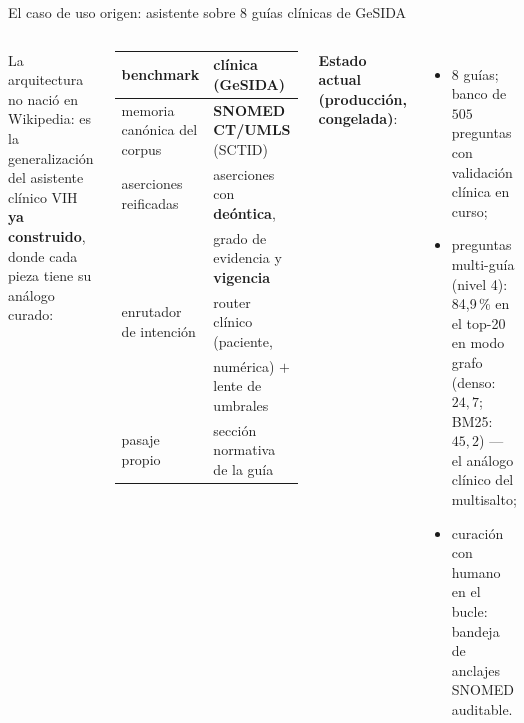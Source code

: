 \documentclass[aspectratio=169,10pt]{beamer}
\begin{document}
\begin{frame}{El caso de uso origen: asistente sobre 8 guías clínicas de GeSIDA}
\begin{columns}[T]
La arquitectura no nació en Wikipedia: es la generalización del asistente
clínico VIH \textbf{ya construido}, donde cada pieza tiene su análogo curado:
\begin{center}\footnotesize
\begin{tabular}{ll}
\toprule
benchmark & clínica (GeSIDA)\\
\midrule
memoria canónica del corpus & \textbf{SNOMED\,CT/UMLS} (SCTID)\\
aserciones reificadas & aserciones con \textbf{deóntica},\\
 & grado de evidencia y \textbf{vigencia}\\
enrutador de intención & router clínico (paciente,\\
 & numérica) $+$ lente de umbrales\\
pasaje propio & sección normativa de la guía\\
\bottomrule
\end{tabular}
\end{center}
\footnotesize
\textbf{Estado actual (producción, congelada)}:
\begin{itemize}\footnotesize
\item 8 guías; banco de $505$ preguntas con validación clínica en curso;
\item preguntas multi-guía (nivel 4): 84,9\,\% en el top-20 en modo grafo
  (denso: $24{,}7$; BM25: $45{,}2$) --- el análogo clínico del multisalto;
\item curación con humano en el bucle: bandeja de anclajes SNOMED auditable.
\end{itemize}
\end{columns}
\vspace{1mm}
\centering
{}
\end{frame}
\end{document}
